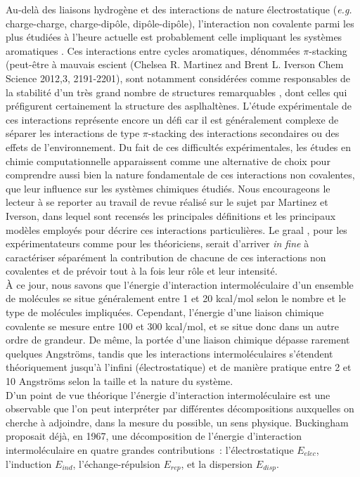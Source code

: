 \documentclass[12pt,a4paper]{book}
\begin{document}
	Au-delà des liaisons hydrogène et des interactions de nature électrostatique (\textit{e.g.} charge-charge, charge-dipôle, dipôle-dipôle), l’interaction non covalente parmi les plus étudiées à l’heure actuelle est probablement celle impliquant les systèmes aromatiques \cite{grimme2008special}. Ces interactions entre cycles aromatiques, dénommées \og $\pi$-stacking \fg{} (peut-être à mauvais escient (Chelsea R. Martinez and Brent L. Iverson Chem Science 2012,3, 2191-2201), sont notamment considérées comme responsables de la stabilité d’un très grand nombre de structures remarquables \cite{mcgaughey1998pi}, dont celles qui préfigurent certainement la structure des asplhaltènes. L’étude expérimentale de ces interactions représente encore un défi car il est généralement complexe de séparer les interactions de type $\pi$-stacking des interactions secondaires ou des effets de l’environnement. Du fait de ces difficultés expérimentales, les études en chimie computationnelle apparaissent comme une alternative de choix pour comprendre aussi bien la nature fondamentale de ces interactions non covalentes, que leur influence sur les systèmes chimiques étudiés. Nous encourageons le lecteur à se reporter au travail de revue réalisé sur le sujet par Martinez et Iverson, dans lequel sont recensés les principales définitions et les principaux modèles employés pour décrire ces interactions particulières.
	Le \og graal \fg{}, pour les expérimentateurs comme pour les théoriciens, serait d’arriver \textit{in fine} à caractériser séparément la contribution de chacune de ces interactions non covalentes et de prévoir tout à la fois leur rôle et leur intensité.\\
	
	À ce jour, nous savons que l’énergie d'interaction intermoléculaire d'un ensemble de molécules se situe généralement entre 1 et 20 kcal/mol selon le nombre et le type de molécules impliquées. Cependant, l'énergie d'une liaison chimique covalente se mesure entre 100 et 300 kcal/mol, et se situe donc dans un autre ordre de grandeur. De même, la portée d’une liaison chimique dépasse rarement quelques Angströms, tandis que les interactions intermoléculaires s'étendent théoriquement jusqu'à l'infini (électrostatique) et de manière pratique entre 2 et 10 Angströms selon la taille et la nature du système.\\
	
	D’un point de vue théorique l’énergie d’interaction intermoléculaire est une observable que l’on peut interpréter par différentes décompositions auxquelles on cherche à adjoindre, dans la mesure du possible, un sens physique. Buckingham \cite{buckingham1967permanent} proposait déjà, en 1967, une décomposition de l’énergie d’interaction intermoléculaire en quatre grandes contributions : l’électrostatique $E_{elec}$, l’induction $E_{ind}$, l’échange-répulsion $E_{rep}$, et la dispersion $E_{disp}$.\\
	
\end{document}
